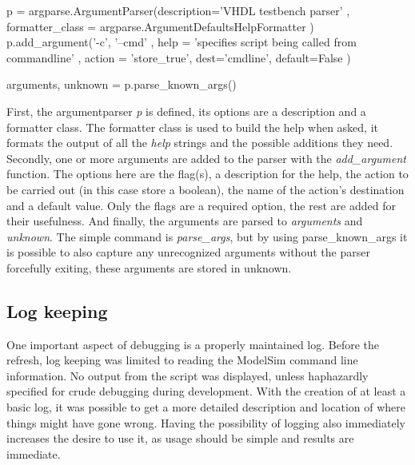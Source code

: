 \documentclass[11pt,british]{article}
\begin{document}
\begin{python}
p = argparse.ArgumentParser(description='VHDL testbench parser'
                            , formatter_class
                              = argparse.ArgumentDefaultsHelpFormatter )
p.add_argument('-c', '--cmd'
               , help = 'specifies script being called from commandline'
               , action = 'store_true', dest='cmdline', default=False )
               
arguments, unknown = p.parse_known_args()
\end{python}
First, the argumentparser \emph{p} is defined, its options are a description and a formatter class. The formatter class is used to build the help when asked, it formats the output of all the \emph{help} strings and the possible additions they need. Secondly, one or more arguments are added to the parser with the \emph{add\_argument} function. The options here are the flag(s), a description for the help, the action to be carried out (in this case store a boolean), the name of the action's destination and a default value. Only the flags are a required option, the rest are added for their usefulness. And finally, the arguments are parsed to \emph{arguments} and \emph{unknown}. The simple command is \emph{parse\_args}, but by using {parse\_known\_args} it is possible to also capture any unrecognized arguments without the parser forcefully exiting, these arguments are stored in unknown.

\subsection{Log keeping}
One important aspect of debugging is a properly maintained log. Before the refresh, log keeping was limited to reading the ModelSim command line information. No output from the script was displayed, unless haphazardly specified for crude debugging during development. With the creation of at least a basic log, it was possible to get a more detailed description and location of where things might have gone wrong. Having the possibility of logging also immediately increases the desire to use it, as usage should be simple and results are immediate.
\end{document}
